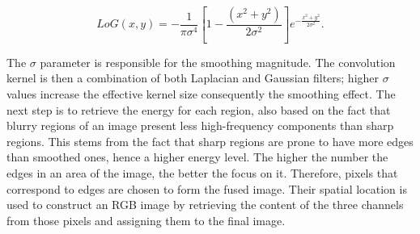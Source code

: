 \begin{equation}
\label{eqn:laplacian_of_gaussian}
LoG(x,y) = - \frac{1}{\pi \sigma^{4}}
            \left[
                1 - \frac{(x^{2} + y^{2})}{2 \sigma^{2}}
            \right]
            e^{- \frac{x^{2} + y^{2}}{2 \sigma^{2}}}.
\end{equation}

\noindent The $\sigma$ parameter is responsible for the smoothing magnitude. The convolution kernel is then a combination of both Laplacian and Gaussian filters; higher $\sigma$ values increase the effective kernel size consequently the smoothing effect. The next step is to retrieve the energy for each region, also based on the fact that blurry regions of an image present less high-frequency components than sharp regions. This stems from the fact that sharp regions are prone to have more edges than smoothed ones, hence a higher energy level. The higher the number the edges in an area of the image, the better the focus on it. Therefore, pixels that correspond to edges are chosen to form the fused image. Their spatial location is used to construct an RGB image by retrieving the content of the three channels from those pixels and assigning them to the final image.